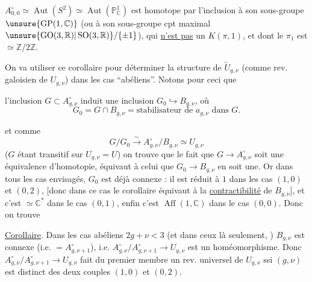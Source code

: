 $A_{0,0}^{\circ}\simeq\operatorname{Aut}(S^2)\simeq\operatorname{Aut}(\mathbb P_{\mathbb C}^1)$ est homotope par l'inclusion à son sous-groupe $\unsure{\operatorname{GP}(1,\mathbb C)}$ (ou à son sous-groupe cpt maximal $\unsure{\operatorname{GO}(3,\mathbb R)|\operatorname{SO}(3,\mathbb R)}/\{\pm1\}$), qui \uline{n'est pas} un $K(\pi,1)$, et dont le $\pi_1$ est $\simeq\mathbb Z/2\mathbb Z$.

On va utiliser ce corollaire pour déterminer la structure de $\widetilde U_{g,\nu}$ (comme rev. galoisien de $U_{g,\nu}$) dans les cas ``abéliens''. Notons pour ceci que


l'inclusion $G\subset A_{g,\nu}^{\circ}$ induit une inclusion $G_0\hookrightarrow B_{g,\nu}$, où 
\[
\tag{40}
G_0=G\cap B_{g,\nu}=\text{stabilisateur de }a_{g,\nu}\text{ dans }G.
\]

et comme
\[
G/G_0\xrightarrow{\sim}A_{g,\nu}^{\circ}/B_{g,\nu}\simeq U_{g,\nu}
\]
($G$ étant transitif sur $U_{g,\nu}=U$) on trouve que le fait que $G\longrightarrow A_{g,\nu}^{\circ}$ soit une équivalence d'homotopie, équivaut à celui que $G_0\longrightarrow B_{g,\nu}$ en soit une. Or dans tous les cas envisagés, $G_0$ est déjà connexe : il est réduit à $1$ dans les cas $(1,0)$ et $(0,2)$, [donc dans ce cas le corollaire équivaut à la \uline{contractibilité} de $B_{g,\nu}$], et c'est $\simeq\mathbb C^*$ dans le cas $(0,1)$, enfin c'est $\operatorname{Aff}(1,\mathbb C)$ dans le cas $(0,0)$. Donc on trouve

\uline{Corollaire}. Dans les cas abéliens $2g+\nu<3$ (et dans ceux là seulement, ) $B_{g,\nu}$ est connexe (i.e. $=A_{g,\nu+1}^{\circ}$), i.e. $A_{g,\nu}^{\circ}/A_{g,\nu+1}^{\circ}\longrightarrow U_{g,\nu}$ est un homéomorphisme. Donc $A_{g,\nu}^{\circ}/A_{g,\nu+1}^{\circ}\longrightarrow U_{g,\nu}$ fait du premier membre un rev. universel de $U_{g,\nu}$ ssi $(g,\nu)$ est distinct des deux couples $(1,0)$ et $(0,2)$.

